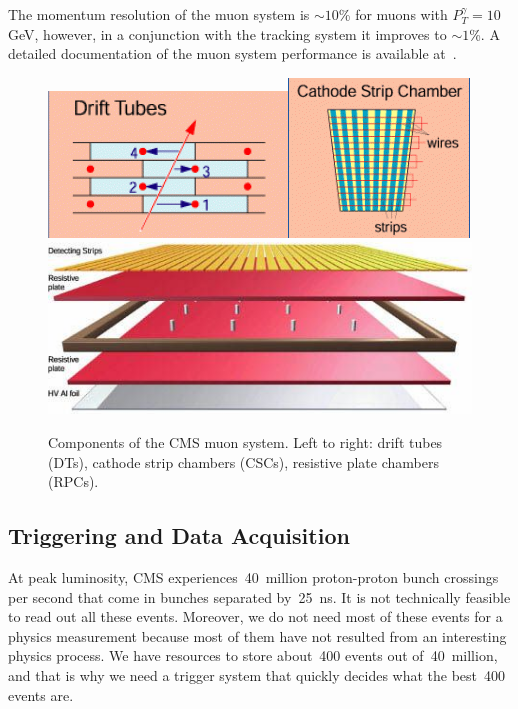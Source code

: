 The momentum resolution of the muon system is $\sim 10$\% for muons with $P_T^{\gamma}=10~$GeV, however, in a conjunction with the tracking system it improves to $\sim 1$\%. A detailed documentation of the muon system performance is available at~\cite{ref_MuonSystemPerformance}. 


\begin{figure}[htb]
  \begin{center}
    \includegraphics[height=2.5 cm]{../figs/Exp/muonSystem_driftTubes.png}\quad\includegraphics[height=2.5 cm]{../figs/Exp/muonSystem_CSC.png}\quad\includegraphics[height=2.5 cm]{../figs/Exp/muonSystem_RPC.png}
    \caption{Components of the CMS muon system. Left to right: drift tubes (DTs), cathode strip chambers (CSCs), resistive plate chambers (RPCs).}
    \label{fig:muonSystem}
  \end{center}
\end{figure}


\subsection{Triggering and Data Acquisition}

At peak luminosity, CMS experiences~40~million proton-proton bunch crossings per second that come in bunches separated by~25~ns. It is not technically feasible to read out all these events. Moreover, we do not need most of these events for a physics measurement because most of them have not resulted from an interesting physics process. We have resources to store about~400 events out of~40~million, and that is why we need a trigger system that quickly decides what the best~400 events are.

